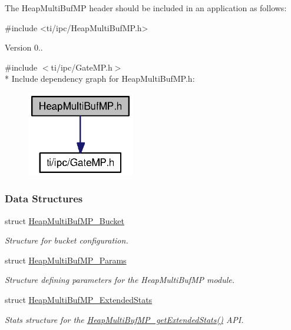 The Heap\-Multi\-Buf\-M\-P header should be included in an application as follows\-: 
\begin{DoxyCode}
\textcolor{preprocessor}{    #include <ti/ipc/HeapMultiBufMP.h>}
\end{DoxyCode}


\begin{DoxyVersion}{Version}
0.. 


\end{DoxyVersion}
{\ttfamily \#include $<$ti/ipc/\-Gate\-M\-P.\-h$>$}\\*
Include dependency graph for Heap\-Multi\-Buf\-M\-P.\-h\-:
\nopagebreak
\begin{figure}[H]
\begin{center}
\leavevmode
\includegraphics[width=133pt]{_heap_multi_buf_m_p_8h__incl}
\end{center}
\end{figure}
\subsubsection*{Data Structures}
\begin{DoxyCompactItemize}
\item 
struct \hyperlink{struct_heap_multi_buf_m_p___bucket}{Heap\-Multi\-Buf\-M\-P\-\_\-\-Bucket}
\begin{DoxyCompactList}\small\item\em Structure for bucket configuration. \end{DoxyCompactList}\item 
struct \hyperlink{struct_heap_multi_buf_m_p___params}{Heap\-Multi\-Buf\-M\-P\-\_\-\-Params}
\begin{DoxyCompactList}\small\item\em Structure defining parameters for the Heap\-Multi\-Buf\-M\-P module. \end{DoxyCompactList}\item 
struct \hyperlink{struct_heap_multi_buf_m_p___extended_stats}{Heap\-Multi\-Buf\-M\-P\-\_\-\-Extended\-Stats}
\begin{DoxyCompactList}\small\item\em Stats structure for the \hyperlink{_heap_multi_buf_m_p_8h_a386420101752537b59e12520aafd9b0d}{Heap\-Multi\-Buf\-M\-P\-\_\-get\-Extended\-Stats()} A\-P\-I. \end{DoxyCompactList}\end{DoxyCompactItemize}
